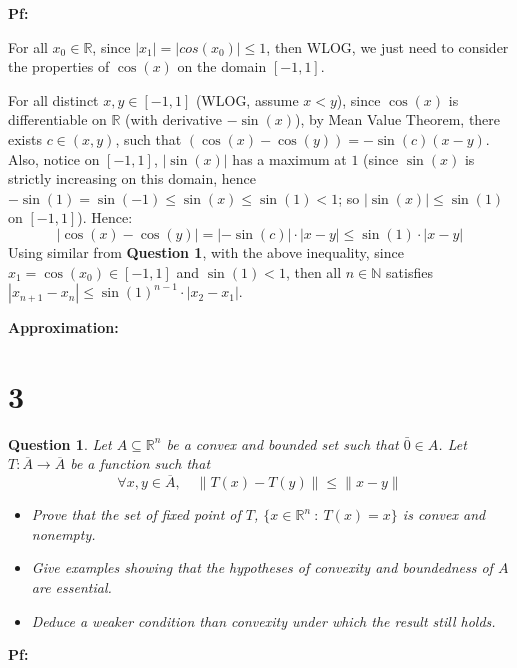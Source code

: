 \documentclass{article}
\newtheorem{question}{Question}
\begin{document}
\textbf{Pf:}

For all $x_0\in\mathbb{R}$, since $|x_1|=|cos(x_0)|\leq 1$, then WLOG, we just need to consider the properties of $\cos(x)$ on the domain $[-1,1]$.

For all distinct $x,y\in[-1,1]$ (WLOG, assume $x<y$), since $\cos(x)$ is differentiable on $\mathbb{R}$ (with derivative $-\sin(x)$), by Mean Value Theorem, 
there exists $c\in (x,y)$, such that $(\cos(x)-\cos(y))=-\sin(c)(x-y)$. Also, notice on $[-1,1]$, $|\sin(x)|$ has a maximum at $1$ 
(since $\sin(x)$ is strictly increasing on this domain, hence $-\sin(1)=\sin(-1)\leq \sin(x)\leq \sin(1) < 1$; so $|\sin(x)|\leq \sin(1)$ on $[-1,1]$). Hence:
$$|\cos(x)-\cos(y)|=|-\sin(c)|\cdot|x-y| \leq \sin(1)\cdot|x-y|$$
Using similar
 from \textbf{Question 1}, with the above inequality, since $x_1=\cos(x_0)\in[-1,1]$ and $\sin(1)<1$, 
then all $n\in\mathbb{N}$ satisfies $|x_{n+1}-x_n|\leq \sin(1)^{n-1}\cdot |x_2-x_1|$.


\hfil

\textbf{Approximation:}


\break

\section*{3}
\begin{myBox}[]{}
    \begin{question}
        Let $A\subseteq \mathbb{R}^n$ be a convex and bounded set such that $\bar{0}\in A$. 
        Let $T:\overline{A}\rightarrow\overline{A}$ be a function such that 
        $$\forall x,y\in\overline{A},\quad \|T(x)-T(y)\|\leq \|x-y\|$$
        \begin{itemize}
            \item[(a)] Prove that the set of fixed point of $T$, $\{x\in\mathbb{R}^n\ :\ T(x)=x\}$ is convex and nonempty.
            \item[(b)] Give examples showing that the hypotheses of convexity and boundedness of $A$ are essential.
            \item[(c)] Deduce a weaker condition than convexity under which the result still holds.  
        \end{itemize}
    \end{question}
\end{myBox}

\textbf{Pf:}
\end{document}
